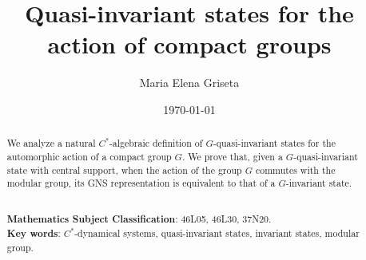 \documentclass[12pt]{amsart}
\numberwithin{equation}{section}
\theoremstyle{definition}
\begin{document}
\title[Quasi-invariant states]
{Quasi-invariant states for the action of compact groups}
\author[Maria Elena Griseta]{Maria Elena Griseta}
\address{Maria Elena Griseta\\
Dipartimento di Matematica\\
Universit\`{a} degli studi di Bari\\
Via E. Orabona, 4, 70125 Bari, Italy}

\date{\today}
\begin{abstract}
We analyze a natural $C^*$-algebraic definition of $G$-quasi-invariant states for the automorphic action of a compact group $G$. We prove that, given a $G$-quasi-invariant state with central support, when the action of the group $G$ commutes with the modular group, its GNS representation is equivalent to that of a $G$-invariant state.   

\vskip0.1cm\noindent \\
{\bf Mathematics Subject Classification}: 46L05, 46L30, 37N20.  \\
{\bf Key words}: $C^*$-dynamical systems, quasi-invariant states, invariant states, modular group. 
\end{abstract}

\maketitle
\end{document}
